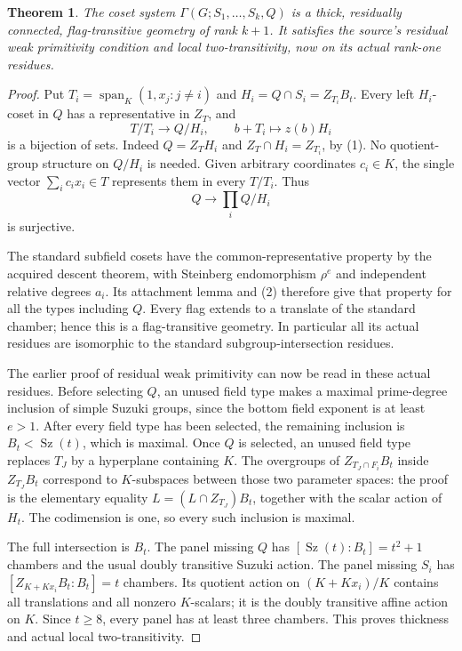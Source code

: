 \documentclass[11pt,a4paper]{article}
\newtheorem{theorem}{Theorem}\newcommand{\Sz}{\operatorname{Sz}}
\begin{document}
\begin{theorem}
The coset system $\Gamma(G;S_1,\ldots,S_k,Q)$ is a thick,
residually connected, flag-transitive geometry of rank $k+1$.
It satisfies the source's residual weak primitivity condition and
local two-transitivity, now on its actual rank-one residues.
\end{theorem}
\begin{proof}
Put $T_i=\operatorname{span}_K(1,x_j:j\ne i)$ and
$H_i=Q\cap S_i=Z_{T_i}B_t$. Every left $H_i$-coset in $Q$ has a
representative in $Z_T$, and
\[
 T/T_i\longrightarrow Q/H_i,\qquad b+T_i\longmapsto z(b)H_i
 \tag{2}
\]
is a bijection of sets. Indeed $Q=Z_TH_i$ and
$Z_T\cap H_i=Z_{T_i}$, by (1). No quotient-group structure on
$Q/H_i$ is needed. Given arbitrary coordinates $c_i\in K$, the
single vector $\sum_i c_ix_i\in T$ represents them in every $T/T_i$.
Thus
\[
 Q\longrightarrow\prod_i Q/H_i
\]
is surjective.

The standard subfield cosets have the common-representative property by
the acquired descent theorem, with Steinberg endomorphism $\rho^e$
and independent relative degrees $a_i$. Its attachment lemma and (2)
therefore give that property for all the types including $Q$.
Every flag extends to a translate of the standard chamber; hence this
is a flag-transitive geometry. In particular all its actual residues
are isomorphic to the standard subgroup-intersection residues.

The earlier proof of residual weak primitivity can now be read in these
actual residues. Before selecting $Q$, an unused field type makes a
maximal prime-degree inclusion of simple Suzuki groups, since the bottom
field exponent is at least $e>1$. After every field type has been
selected, the remaining inclusion is $B_t<\Sz(t)$, which is maximal.
Once $Q$ is selected, an unused field type replaces $T_J$ by a
hyperplane containing $K$. The overgroups of $Z_{T_J\cap F_i}B_t$
inside $Z_{T_J}B_t$ correspond to $K$-subspaces between those two
parameter spaces: the proof is the elementary equality
$L=(L\cap Z_{T_J})B_t$, together with the scalar action of $H_t$.
The codimension is one, so every such inclusion is maximal.

The full intersection is $B_t$. The panel missing $Q$ has
$[\Sz(t):B_t]=t^2+1$ chambers and the usual doubly transitive Suzuki
action. The panel missing $S_i$ has $[Z_{K+Kx_i}B_t:B_t]=t$
chambers. Its quotient action on $(K+Kx_i)/K$ contains all translations
and all nonzero $K$-scalars; it is the doubly transitive affine action
on $K$. Since $t\ge8$, every panel has at least three chambers.
This proves thickness and actual local two-transitivity.


\end{proof}
\end{document}
